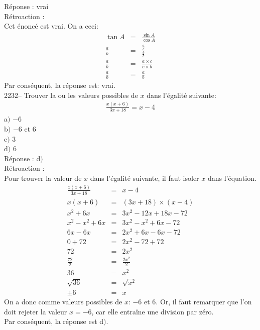 \documentclass[letterpaper, 12pt]{article}
\begin{document}
R\'eponse : vrai\\

R\'etroaction :\\
Cet \'enonc\'e est vrai. On a ceci:
\begin{eqnarray*}
\tan{A}&=&\frac{\sin{A}}{\cos{A}}\\[2mm]
\frac{a}{b}&=&\frac{\frac{a}{c}}{\frac{b}{c}}\\[2mm]
\frac{a}{b}&=&\frac{a\times c}{c\times b}\\[2mm]
\frac{a}{b}&=&\frac{a}{b}
\end{eqnarray*}
Par cons\'equent, la r\'eponse est: vrai.\\


2232-- Trouver la ou les valeurs possibles de $x$ dans l'\'egalit\'e suivante:
\begin{eqnarray*}
 \frac{x(x+6)}{3x+18}=x-4
\end{eqnarray*}
a$)$ $-6$\\
b$)$ $-6$ et $6$\\
c$)$ $3$\\
d$)$ $6$\\

R\'eponse : d$)$\\

R\'etroaction :\\
Pour trouver la valeur de $x$ dans l'\'egalit\'e suivante, il faut isoler $x$ dans l'\'equation.
\begin{eqnarray*}
\frac{x(x+6)}{3x+18}&=&x-4\\[2mm]
x(x+6)&=&(3x+18)\times(x-4)\\
x^{2}+6x&=&3x^{2}-12x+18x-72\\
x^{2}-x^{2}+6x&=&3x^{2}-x^{2}+6x-72\\
6x-6x&=&2x^{2}+6x-6x-72\\
0+72&=&2x^{2}-72+72\\
72&=&2x^{2}\\[2mm]
\frac{72}{2}&=&\frac{2x^{2}}{2}\\[2mm]
36&=&x^{2}\\
\sqrt{36}&=&\sqrt{x^{2}}\\
\pm6&=&x
\end{eqnarray*}
On a donc comme valeurs possibles de $x$: $-6$ et $6$. Or, il faut remarquer que l'on doit rejeter la valeur $x=-6$, car elle entra\^ine une division par z\'ero.\\
Par cons\'equent, la r\'eponse est d$)$. \\
\end{document}
